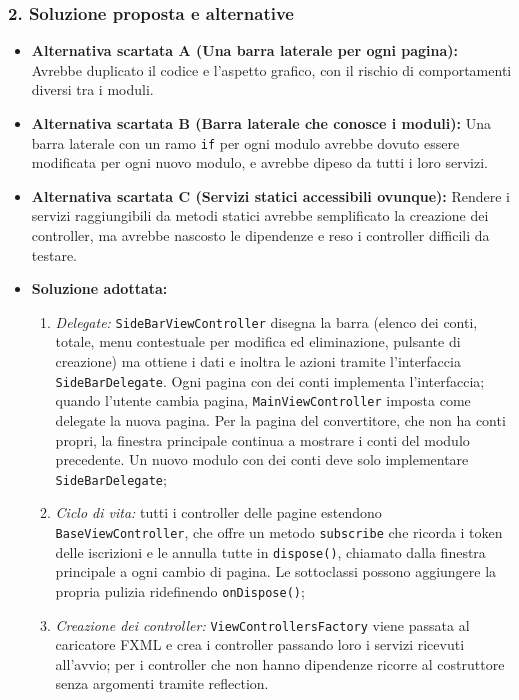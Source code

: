 \documentclass[11pt,a4paper,openright]{report}
\begin{document}
\subsubsection*{2. Soluzione proposta e alternative}
\begin{itemize}
    \item \textbf{Alternativa scartata A (Una barra laterale per ogni pagina):} Avrebbe duplicato il codice e l'aspetto grafico, con il rischio di comportamenti diversi tra i moduli.
    \item \textbf{Alternativa scartata B (Barra laterale che conosce i moduli):} Una barra laterale con un ramo \texttt{if} per ogni modulo avrebbe dovuto essere modificata per ogni nuovo modulo, e avrebbe dipeso da tutti i loro servizi.
    \item \textbf{Alternativa scartata C (Servizi statici accessibili ovunque):} Rendere i servizi raggiungibili da metodi statici avrebbe semplificato la creazione dei controller, ma avrebbe nascosto le dipendenze e reso i controller difficili da testare.
    \item \textbf{Soluzione adottata:}
    \begin{enumerate}
        \item \emph{Delegate:} \texttt{SideBarViewController} disegna la barra (elenco dei conti, totale, menu contestuale per modifica ed eliminazione, pulsante di creazione) ma ottiene i dati e inoltra le azioni tramite l'interfaccia \texttt{SideBarDelegate}. Ogni pagina con dei conti implementa l'interfaccia; quando l'utente cambia pagina, \texttt{MainViewController} imposta come delegate la nuova pagina. Per la pagina del convertitore, che non ha conti propri, la finestra principale continua a mostrare i conti del modulo precedente. Un nuovo modulo con dei conti deve solo implementare \texttt{SideBarDelegate};
        \item \emph{Ciclo di vita:} tutti i controller delle pagine estendono \texttt{BaseViewController}, che offre un metodo \texttt{subscribe} che ricorda i token delle iscrizioni e le annulla tutte in \texttt{dispose()}, chiamato dalla finestra principale a ogni cambio di pagina. Le sottoclassi possono aggiungere la propria pulizia ridefinendo \texttt{onDispose()};
        \item \emph{Creazione dei controller:} \texttt{ViewControllersFactory} viene passata al caricatore FXML e crea i controller passando loro i servizi ricevuti all'avvio; per i controller che non hanno dipendenze ricorre al costruttore senza argomenti tramite reflection.
    \end{enumerate}
\end{itemize}
\end{document}

